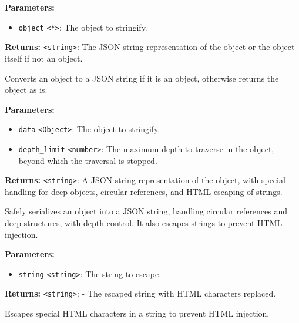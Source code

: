 \documentclass[12pt,a4paper]{article}
\begin{document}
\noindent \textbf{Parameters:}
\begin{itemize}
  \item \texttt{object} \texttt{<*>}: The object to stringify.
\end{itemize}

\noindent \textbf{Returns:} \texttt{<string>}: The JSON string representation of the object or the object itself if not an object.

\noindent Converts an object to a JSON string if it is an object, otherwise returns the object as is.

\vspace{5mm}
\noindent {}


\noindent \textbf{Parameters:}
\begin{itemize}
  \item \texttt{data} \texttt{<Object>}: The object to stringify.
  \item \texttt{depth\_limit} \texttt{<number>}: The maximum depth to traverse in the object, beyond which the traversal is stopped.
\end{itemize}

\noindent \textbf{Returns:} \texttt{<string>}: A JSON string representation of the object, with special handling for deep objects, circular references, and HTML escaping of strings.

\noindent Safely serializes an object into a JSON string, handling circular references and deep structures, with depth control.
It also escapes strings to prevent HTML injection.

\vspace{5mm}
\noindent {}


\noindent \textbf{Parameters:}
\begin{itemize}
  \item \texttt{string} \texttt{<string>}: The string to escape.
\end{itemize}

\noindent \textbf{Returns:} \texttt{<string>}: - The escaped string with HTML characters replaced.

\noindent Escapes special HTML characters in a string to prevent HTML injection.
\end{document}
